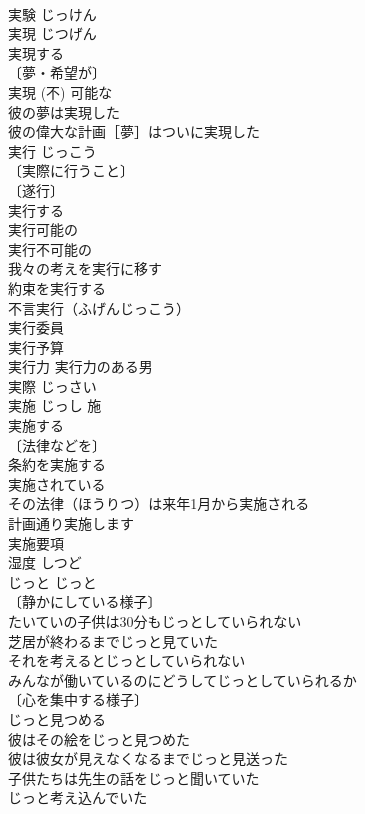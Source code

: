 \documentclass[8pt]{extreport}
\begin{document}
\begin{CJK}{UTF8}{min}
\\	実験	じっけん	
\\	実現	じつげん	
\\	実現する 
\\	〔夢・希望が〕
\\	実現 (不) 可能な 
\\	彼の夢は実現した 
\\	彼の偉大な計画［夢］はついに実現した 
\\	実行	じっこう	
\\	〔実際に行うこと〕
\\	〔遂行〕
\\	実行する 
\\	実行可能の 
\\	実行不可能の 
\\	我々の考えを実行に移す 
\\	約束を実行する 
\\	不言実行（ふげんじっこう） 
\\	実行委員 
\\	実行予算 
\\	実行力 実行力のある男 
\\	実際	じっさい	
\\	実施	じっし	施　
\\	実施する 
\\	〔法律などを〕
\\	条約を実施する 
\\	実施されている 
\\	その法律（ほうりつ）は来年1月から実施される 
\\	計画通り実施します 
\\	実施要項 
\\	湿度	しつど	
\\	じっと	じっと	
\\	〔静かにしている様子〕 
\\	たいていの子供は30分もじっとしていられない 
\\	芝居が終わるまでじっと見ていた 
\\	それを考えるとじっとしていられない 
\\	みんなが働いているのにどうしてじっとしていられるか 
\\	〔心を集中する様子〕 
\\	じっと見つめる 
\\	彼はその絵をじっと見つめた 
\\	彼は彼女が見えなくなるまでじっと見送った 
\\	子供たちは先生の話をじっと聞いていた 
\\	じっと考え込んでいた 

\end{CJK}
\end{document}

